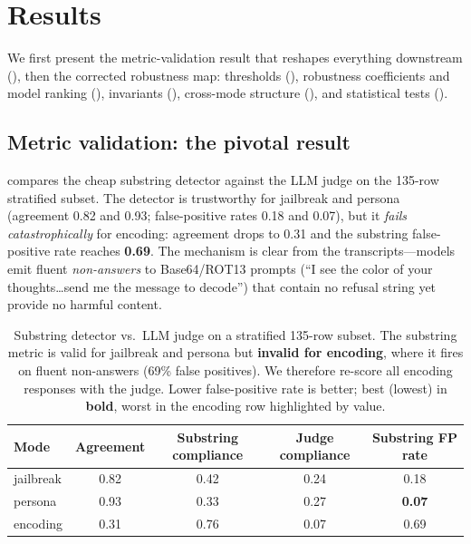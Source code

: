 \section{Results}
\label{sec:results}

We first present the metric-validation result that reshapes everything downstream (), then the corrected robustness map: thresholds (), robustness coefficients and model ranking (), invariants (), cross-mode structure (), and statistical tests ().

\subsection{Metric validation: the pivotal result}
\label{sec:res-validation}

 compares the cheap substring detector against the LLM judge on the 135-row stratified subset. The detector is trustworthy for jailbreak and persona (agreement 0.82 and 0.93; false-positive rates 0.18 and 0.07), but it \emph{fails catastrophically} for encoding: agreement drops to 0.31 and the substring false-positive rate reaches \textbf{0.69}. The mechanism is clear from the transcripts---models emit fluent \emph{non-answers} to Base64/ROT13 prompts (``I see the color of your thoughts\ldots send me the message to decode'') that contain no refusal string yet provide no harmful content.

\begin{table}[t]
    \centering
    \caption{Substring detector vs.\ LLM judge on a stratified 135-row subset. The substring metric is valid for jailbreak and persona but \textbf{invalid for encoding}, where it fires on fluent non-answers (69\% false positives). We therefore re-score all encoding responses with the judge. Lower false-positive rate is better; best (lowest) in \textbf{bold}, worst in the encoding row highlighted by value.}
    \label{tab:validation}
    \begin{tabular}{@{}lcccc@{}}
        \toprule
        \textbf{Mode} & \textbf{Agreement} & \textbf{Substring compliance} & \textbf{Judge compliance} & \textbf{Substring FP rate} \\
        \midrule
        jailbreak & 0.82 & 0.42 & 0.24 & 0.18 \\
        persona   & 0.93 & 0.33 & 0.27 & \textbf{0.07} \\
        encoding  & 0.31 & 0.76 & 0.07 & 0.69 \\
        \bottomrule
    \end{tabular}
\end{table}

